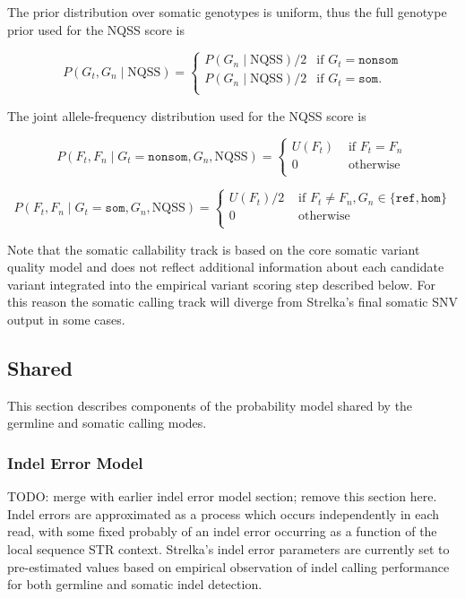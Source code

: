 \documentclass{article}
\begin{document}
The prior distribution over somatic genotypes is uniform, thus the full genotype prior used for the NQSS score is

\begin{equation*}
P(G_t, G_n \mid \text{NQSS}) =
\begin{cases}
P(G_n \mid \text{NQSS})/2 & \text{if } G_t = \texttt{nonsom} \\
P(G_n \mid \text{NQSS})/2 & \text{if } G_t = \texttt{som}. \\
\end{cases}
\end{equation*}


The joint allele-frequency distribution used for the NQSS score is

\begin{equation*}
P(F_t, F_n \mid G_t = \texttt{nonsom}, G_n, \text{NQSS})=
\begin{cases}
U(F_t) & \text{ if } F_t = F_n \\
0 & \text{ otherwise } \\
\end{cases}
\end{equation*}

\begin{equation*}
P(F_t, F_n \mid G_t = \texttt{som}, G_n, \text{NQSS})=
\begin{cases}
U(F_t)/2 & \text{ if } F_t \neq F_n, G_n \in \{\texttt{ref},\texttt{hom}\}  \\
0 & \text{ otherwise } \\
\end{cases}
\end{equation*}

Note that the somatic callability track is based on the core somatic variant quality model and does not reflect additional information about each candidate variant integrated into the empirical variant scoring step described below. For this reason the somatic calling track will diverge from Strelka's final somatic SNV output in some cases.

\subsection{Shared}
\label{sec:shared}
This section describes components of the probability model shared by the germline and somatic calling modes.

\subsubsection{Indel Error Model}
TODO: merge with earlier indel error model section; remove this section here.
\label{sec:indel_error}
Indel errors are approximated as a process which occurs independently in each read, with some fixed probably of an indel error occurring as a function of the local sequence STR context. Strelka's indel error parameters are currently set to pre-estimated values based on empirical observation of indel calling performance for both germline and somatic indel detection.
\end{document}
